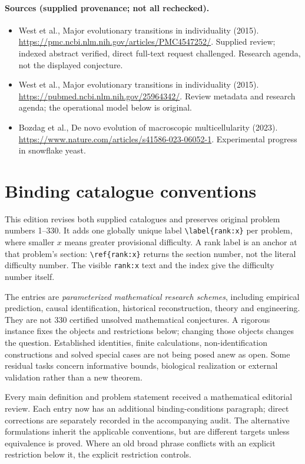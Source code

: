 \documentclass[11pt]{article}
\begin{document}
\paragraph{Sources (supplied provenance; not all rechecked).}
\begin{itemize}
\item West et al., Major evolutionary transitions in individuality (2015). \url{https://pmc.ncbi.nlm.nih.gov/articles/PMC4547252/}. Supplied review; indexed abstract verified, direct full-text request challenged. Research agenda, not the displayed conjecture.
\item West et al., Major evolutionary transitions in individuality (2015). \url{https://pubmed.ncbi.nlm.nih.gov/25964342/}. Review metadata and research agenda; the operational model below is original.
\item Bozdag et al., De novo evolution of macroscopic multicellularity (2023). \url{https://www.nature.com/articles/s41586-023-06052-1}. Experimental progress in snowflake yeast.
\end{itemize}


\section*{Binding catalogue conventions}
This edition revises both supplied catalogues and preserves original problem numbers 1--330. It adds one globally unique label \verb|\label{rank:x}| per problem, where smaller $x$ means greater provisional difficulty. A rank label is an anchor at that problem's section: \verb|\ref{rank:x}| returns the section number, not the literal difficulty number. The visible \texttt{rank:x} text and the index give the difficulty number itself.

The entries are \emph{parameterized mathematical research schemes}, including empirical prediction, causal identification, historical reconstruction, theory and engineering. They are not 330 certified unsolved mathematical conjectures. A rigorous instance fixes the objects and restrictions below; changing those objects changes the question. Established identities, finite calculations, non-identification constructions and solved special cases are not being posed anew as open. Some residual tasks concern informative bounds, biological realization or external validation rather than a new theorem.

Every main definition and problem statement received a mathematical editorial review. Each entry now has an additional binding-conditions paragraph; direct corrections are separately recorded in the accompanying audit. The alternative formulations inherit the applicable conventions, but are different targets unless equivalence is proved. Where an old broad phrase conflicts with an explicit restriction below it, the explicit restriction controls.
\end{document}
